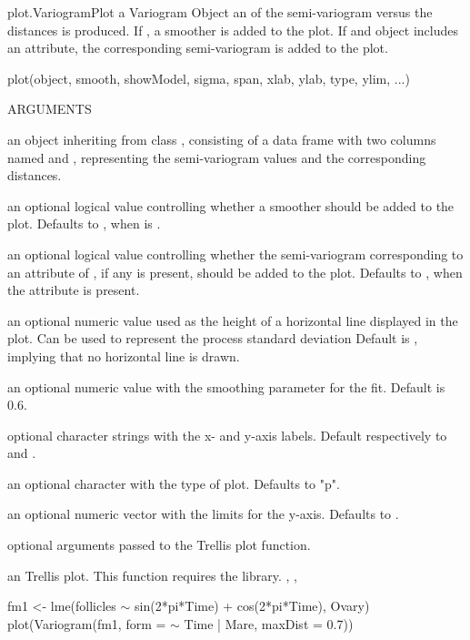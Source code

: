 \documentclass[pdftex]{article} \usepackage{url,graphicx}
\renewcommand{\Twiddle}{\mbox{\(\sim\)}}
\begin{document}
\begin{Helpfile}{plot.Variogram}{Plot a Variogram Object}
an  of the semi-variogram versus the distances is
produced. If , a  smoother is added to
the plot. If  and object includes an
 attribute, the corresponding semi-variogram
is added to the plot.
\begin{Example}
plot(object, smooth, showModel, sigma, span, xlab, ylab, type, ylim, ...)
\end{Example}
\begin{Argument}{ARGUMENTS}
\item[\Co{object:}]
an object inheriting from class ,
consisting of a data frame with two columns named  and
, representing the semi-variogram values and the corresponding
distances.
\item[\Co{smooth:}]
an optional logical value controlling whether a
 smoother should be added to the plot. Defaults to
, when  is .
\item[\Co{showModel:}]
an optional logical value controlling whether the
semi-variogram corresponding to an  attribute of
, if any is present, should be added to the
plot. Defaults to , when the 
attribute is present.
\item[\Co{sigma:}]
an optional numeric value used as the height of a
horizontal line displayed in the plot. Can be used to represent the
process standard deviation Default is , implying that no
horizontal line is drawn. 
\item[\Co{span:}]
an optional numeric value with the smoothing parameter for
the  fit. Default is 0.6.
\item[\Co{xlab,ylab:}]
optional character strings with the x- and y-axis
labels. Default respectively to  and
. 
\item[\Co{type:}]
an optional character with the type of plot. Defaults to
"p".
\item[\Co{ylim:}]
an optional numeric vector with the limits for the
y-axis. Defaults to .
\item[\Co{...:}]
optional arguments passed to the Trellis plot function.
\end{Argument}
an  Trellis plot.
This function requires the  library.
, , 
\need 15pt
\vspace{-16pt}
\begin{Example}
fm1 <- lme(follicles {\Twiddle} sin(2*pi*Time) + cos(2*pi*Time), Ovary)
plot(Variogram(fm1, form = {\Twiddle} Time | Mare, maxDist = 0.7))
\end{Example}
\end{Helpfile}
\end{document}
